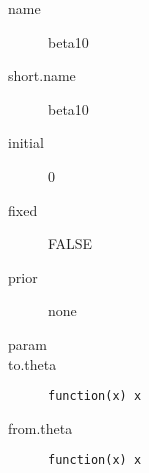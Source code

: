 \begin{description}
\begin{description}
	 	 \begin{description}
	 	 	 \item[ name ] beta10 
	 	 	 \item[ short.name ] beta10 
	 	 	 \item[ initial ] 0 
	 	 	 \item[ fixed ] FALSE 
	 	 	 \item[ prior ] none 
	 	 	 \item[ param ]  
	 	 	 \item[ to.theta ] \verb|function(x) x| 
	 	 	 \item[ from.theta ] \verb|function(x) x| 
	 	 \end{description}
	 \end{description}
\end{description}
